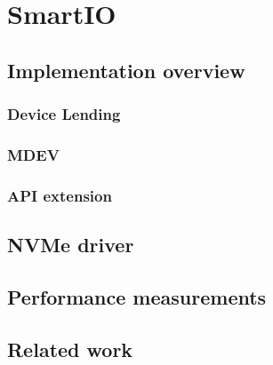 \chapter{SmartIO}\label{sec:smartio}

\section{Implementation overview}
\subsection{Device Lending}
\subsection{MDEV}
\subsection{API extension}

\section{NVMe driver}

\section{Performance measurements}

\section{Related work}
